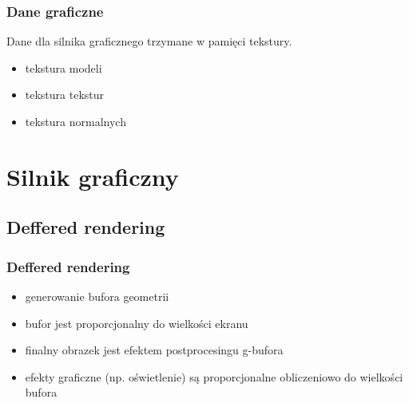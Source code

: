 \documentclass{beamer}
\begin{document}
\frame
{
	\frametitle{Dane graficzne}

	Dane dla silnika graficznego trzymane w pamięci tekstury.
	\begin{itemize}
	\item tekstura modeli
	\item tekstura tekstur
	\item tekstura normalnych
	\end{itemize}
}

\section{Silnik graficzny}\label{sec:silnik graficzny}
\frame{ \tableofcontents[currentsection] }

\subsection{Deffered rendering}\label{sub:deffered rendering}

\frame
{
	\frametitle{Deffered rendering}

	\begin{itemize}
	\item generowanie bufora geometrii
	\item bufor jest proporcjonalny do wielkości ekranu
	\item finalny obrazek jest efektem postprocesingu g-bufora
	\item efekty graficzne (np. oświetlenie) są proporcjonalne obliczeniowo do wielkości bufora
	\end{itemize}
}
\end{document}

